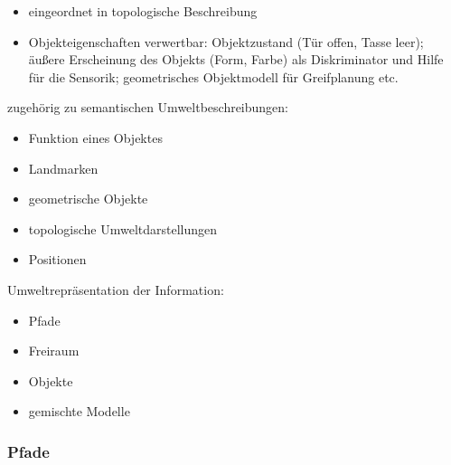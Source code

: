 \begin{description}
\begin{itemize}
\item eingeordnet in topologische Beschreibung
\item Objekteigenschaften verwertbar: Objektzustand (Tür offen, Tasse leer); äußere Erscheinung des Objekts (Form, Farbe) als Diskriminator und Hilfe für die Sensorik; geometrisches Objektmodell für Greifplanung etc.
\end{itemize}
zugehörig zu semantischen Umweltbeschreibungen:
\begin{itemize}
\item Funktion eines Objektes
\item Landmarken
\item geometrische Objekte
\item topologische Umweltdarstellungen
\item Positionen
\end{itemize}
\end{description}

Umweltrepräsentation der Information:
\begin{itemize}
\item Pfade \item Freiraum \item Objekte \item gemischte Modelle
\end{itemize}

\subsubsection*{Pfade}

